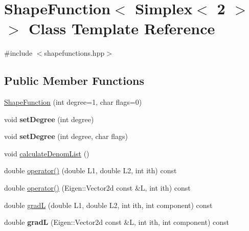 \hypertarget{class_shape_function_3_01_simplex_3_012_01_4_01_4}{
\section{ShapeFunction$<$ Simplex$<$ 2 $>$ $>$ Class Template Reference}
\label{class_shape_function_3_01_simplex_3_012_01_4_01_4}
}


{\ttfamily \#include $<$shapefunctions.hpp$>$}

\subsection*{Public Member Functions}
\begin{DoxyCompactItemize}
\item 
\hyperlink{class_shape_function_3_01_simplex_3_012_01_4_01_4_a33b1e34fe111c95b9b3d53660c6e4efa}{ShapeFunction} (int degree=1, char flags=0)
\item 
\hypertarget{class_shape_function_3_01_simplex_3_012_01_4_01_4_ad27fb4b42f52d7617015ebf19194634e}{
void {\bfseries setDegree} (int degree)}
\label{class_shape_function_3_01_simplex_3_012_01_4_01_4_ad27fb4b42f52d7617015ebf19194634e}

\item 
\hypertarget{class_shape_function_3_01_simplex_3_012_01_4_01_4_a975e8b62e6c774ce335e1eae27744d65}{
void {\bfseries setDegree} (int degree, char flags)}
\label{class_shape_function_3_01_simplex_3_012_01_4_01_4_a975e8b62e6c774ce335e1eae27744d65}

\item 
void \hyperlink{class_shape_function_3_01_simplex_3_012_01_4_01_4_aa071d68ab060f55edec06ae82391f66a}{calculateDenomList} ()
\item 
double \hyperlink{class_shape_function_3_01_simplex_3_012_01_4_01_4_a320d96d5dcae6c488c4570ed07a81048}{operator()} (double L1, double L2, int ith) const 
\item 
double \hyperlink{class_shape_function_3_01_simplex_3_012_01_4_01_4_a613d0e8e7062cfa2c3ca9e062f66e821}{operator()} (Eigen::Vector2d const \&L, int ith) const 
\item 
double \hyperlink{class_shape_function_3_01_simplex_3_012_01_4_01_4_abd548f35b3d7f72514ae9373a7265b46}{gradL} (double L1, double L2, int ith, int component) const 
\item 
\hypertarget{class_shape_function_3_01_simplex_3_012_01_4_01_4_a9417e840cfd609b1a6d79cd8041f9557}{
double {\bfseries gradL} (Eigen::Vector2d const \&L, int ith, int component) const }
\label{class_shape_function_3_01_simplex_3_012_01_4_01_4_a9417e840cfd609b1a6d79cd8041f9557}


\end{DoxyCompactItemize}
